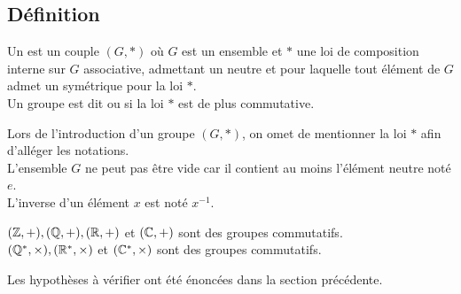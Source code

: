 \documentclass{book}
\begin{document}
\subsection{Définition}
\begin{Definition}[Groupe]
Un  est un couple $(G,\ast)$ où $G$ est un ensemble et $\ast$ une loi de composition interne sur $G$ associative, admettant un neutre et pour laquelle tout élément de $G$ admet un symétrique pour la loi $\ast$.\\
Un groupe est dit  ou  si la loi $\ast$ est de plus commutative.
\end{Definition}
\begin{Remarque}
Lors de l'introduction d'un groupe $(G,*)$, on omet de mentionner la loi $*$ afin d'alléger les notations.\\
L'ensemble $G$ ne peut pas être vide car il contient au moins l'élément neutre noté $e$.\\
L'inverse d'un élément $x$ est noté $x^{-1}$.
\end{Remarque}
\begin{Proposition}
$(\mathbb{Z}, +), (\mathbb{Q}, +), (\mathbb{R}, +)$ et  $(\mathbb{C}, +)$  sont des groupes commutatifs.\\
$(\mathbb{Q}^*, \times), (\mathbb{R}^*, \times)$ et  $(\mathbb{C}^*,\times)$  sont des groupes commutatifs.\\ 
\end{Proposition}
\begin{Demonstration}
Les hypothèses à vérifier ont été énoncées dans la section précédente.
\end{Demonstration}
\end{document}
